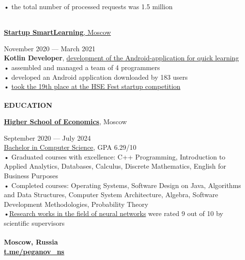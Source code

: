 \documentclass{article}
\begin{document}
\begin{vwcol}[widths={0.8,0.2},
 sep=.8cm, justify=flush,rule=0pt,indent=1em]
• the total number of processed requests was 1.5 million\\
\\
\begin{Large}
\href{https://www.canva.com/design/DAEaT9nPC7Y/y7_r2BzUEiUiFKW36oP-Pw/view?utm_content=DAEaT9nPC7Y&utm_campaign=designshare&utm_medium=link&utm_source=publishsharelink}{\textbf{Startup SmartLearning}, Moscow}
\end{Large}
\hspace{70pt}November 2020 — March 2021\\
\textbf{Kotlin Developer}, \href{https://gitlab.com/peganov.nik/smartlearning}{development of the Android-application for quick learning}\\
• assembled and managed a team of 4 programmers\\
• developed an Android application downloaded by 183 users\\
• \href{https://fest.hse.ru/top1002021}{took the 19th place at the HSE Fest startup competition}\\
\\
\noindent\textcolor[rgb]{0.1255,0.2902,0.7843}{\textbf{\Large{EDUCATION}}}\\
\begin{Large}
\textbf{\href{https://hse.ru/}{Higher School of Economics}}, Moscow
\end{Large}
\hspace{43pt}September 2020 — July 2024\\
\href{https://cs.hse.ru/}{Bachelor in Computer Science}, GPA 6.29/10\\
• Graduated courses with excellence: C++ Programming, Introduction to Applied Analytics, Databases, Calculus, Discrete Mathematics, English for Business Purposes\\
• Completed courses: Operating Systems, Software Design on Java, Algorithms and Data Structures, Computer System Architecture, Algebra, Software Development Methodologies, Probability Theory\\
•\href{https://github.com/NikPeg/synchronization-of-neuromorphic-networks-of-the-close-world-from-the-point-of-view-of-complexes} {Research works in the field of neural networks} were rated 9 out of 10 by scientific supervisors\\
\newpage
~\\
\noindent\textbf{Moscow, Russia}\\
\noindent\textbf{\textcolor[rgb]{0.1255,0.2902,0.7843}{\href{https://t.me/peganov\_ns}{t.me/peganov\_ns}}}\\

\end{vwcol}
\end{document}
